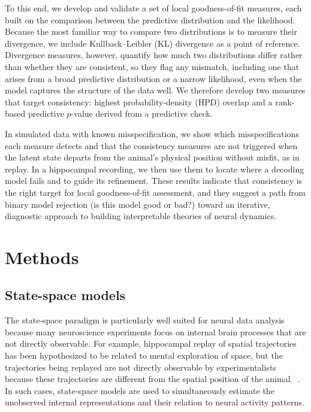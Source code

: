 \documentclass[12pt]{article}
\begin{document}
To this end, we develop and validate a set of local goodness-of-fit measures, each built on the comparison between the predictive distribution and the likelihood. Because the most familiar way to compare two distributions is to measure their divergence, we include Kullback--Leibler (KL) divergence as a point of reference. Divergence measures, however, quantify how much two distributions differ rather than whether they are consistent, so they flag any mismatch, including one that arises from a broad predictive distribution or a narrow likelihood, even when the model captures the structure of the data well. We therefore develop two measures that target consistency: highest probability-density (HPD) overlap and a rank-based predictive $p$-value derived from a predictive check.

In simulated data with known misspecification, we show which misspecifications each measure detects and that the consistency measures are not triggered when the latent state departs from the animal's physical position without misfit, as in replay. In a hippocampal recording, we then use them to locate where a decoding model fails and to guide its refinement. These results indicate that consistency is the right target for local goodness-of-fit assessment, and they suggest a path from binary model rejection (is this model good or bad?) toward an iterative, diagnostic approach to building interpretable theories of neural dynamics.

\section*{Methods}\label{sec:methods}
\subsection*{State-space models}\label{sec:statespace}
The state-space paradigm is particularly well suited for neural data analysis because many neuroscience experiments focus on internal brain processes that are not directly observable. For example, hippocampal replay of spatial trajectories has been hypothesized to be related to mental exploration of space, but the trajectories being replayed are not directly observable by experimentalists because these trajectories are different from the spatial position of the animal ~\cite{EdenCharacterizingComplexMultiScale2018}. In such cases, state-space models are used to simultaneously estimate the unobserved internal representations and their relation to neural activity patterns.
\end{document}

